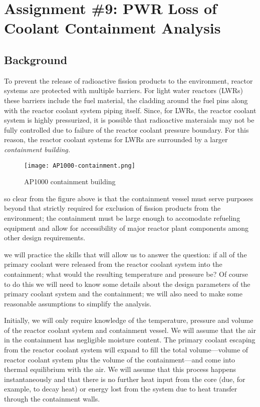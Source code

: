 \chapter{Assignment \#9: PWR Loss of Coolant Containment Analysis}
\label{ch:ass9}


\begin{fullwidth}
\section{Background}
To prevent the release of radioactive fission products to the environment, reactor systems are protected with multiple barriers.  For light water reactors (LWRs) these barriers include the fuel material, the cladding around the fuel pins along with the reactor coolant system piping itself.  Since, for LWRs, the reactor coolant system is highly pressurized, it is possible that radioactive materaials may not be fully controlled due to failure of the reactor coolant pressure boundary.  For this reason, the reactor coolant systems for LWRs are surrounded by a larger \emph{containment building.}
\begin{figure}
\texttt{[image: AP1000-containment.png]}
\caption{AP1000 containment building}
\end{figure}
 so clear from the figure above is that the containment vessel must serve purposes beyond that strictly required for exclusion of fission products from the environment; the containment must be large enough to accomodate refueling equipment and allow for accessibility of major reactor plant components among other design requirements.

 we will practice the skills that will allow us to answer the question: if all of the primary coolant were released from the reactor coolant system into the containment; what would the resulting temperature and pressure be?  Of course to do this we will need to know some details about the design parameters of the primary coolant system and the containment; we will also need to make some reasonable assumptions to simplify the analysis. 

Initially, we will only require knowledge of the temperature, pressure and volume of the reactor coolant system and containment vessel.  We will assume that the air in the containment has negligible moisture content.  The primary coolant escaping from the reactor coolant system will expand to fill the total volume---volume of reactor coolant system plus the volume of the containment---and come into thermal equilibrium with the air.  We will assume that this process happens instantaneously and that there is no further heat input from the core (due, for example, to decay heat) or energy lost from the system due to heat transfer through the containment walls.


\end{fullwidth}

